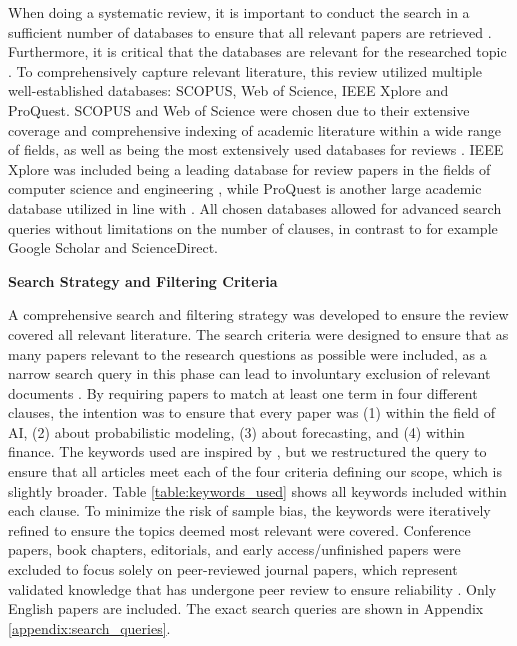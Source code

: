 When doing a systematic review, it is important to conduct the search in a sufficient number of databases to ensure that all relevant papers are retrieved \parencite{hiebl_2021}. Furthermore, it is critical that the databases are relevant for the researched topic \parencite{marzi_et_al_2024}. To comprehensively capture relevant literature, this review utilized multiple well-established databases: SCOPUS, Web of Science, IEEE Xplore and ProQuest. SCOPUS and Web of Science were chosen due to their extensive coverage and comprehensive indexing of academic literature within a wide range of fields, as well as being the most extensively used databases for reviews \parencite{marzi_et_al_2024}. IEEE Xplore was included being a leading database for review papers in the fields of computer science and engineering \parencite{suhaimi2020systematic, carvalho2019systematic, cavacini2015best}, while ProQuest is another large academic database utilized in line with \textcite{gunnarsson2024}. All chosen databases allowed for advanced search queries without limitations on the number of clauses, in contrast to for example Google Scholar and ScienceDirect.

\textbf{Search Strategy and Filtering Criteria}\nopagebreak

A comprehensive search and filtering strategy was developed to ensure the review covered all relevant literature. The search criteria were designed to ensure that as many papers relevant to the research questions as possible were included, as a narrow search query in this phase can lead to involuntary exclusion of relevant documents \parencite{marzi_et_al_2024,kuhrmann2017pragmatic, williams2021reexamining}. By requiring papers to match at least one term in four different clauses, the intention was to ensure that every paper was (1) within the field of AI, (2) about probabilistic modeling, (3) about forecasting, and (4) within finance. The keywords used are inspired by \textcite{Blasco_et_al_2024}, but we restructured the query to ensure that all articles meet each of the four criteria defining our scope, which is slightly broader. Table \ref{table:keywords_used} shows all keywords included within each clause. To minimize the risk of sample bias, the keywords were iteratively refined to ensure the topics deemed most relevant were covered. Conference papers, book chapters, editorials, and early access/unfinished papers were excluded to focus solely on peer-reviewed journal papers, which represent validated knowledge that has undergone peer review to ensure reliability \parencite{marzi_et_al_2024, hota2022hybrid}. Only English papers are included. The exact search queries are shown in Appendix \ref{appendix:search_queries}. 


